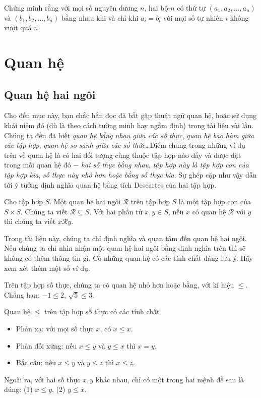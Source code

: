 \begin{exercise}
    Chứng minh rằng với mọi số nguyên dương $n$, hai bộ-$n$ có thứ tự $(a_{1}, a_{2}, \ldots, a_{n})$ và $(b_{1}, b_{2}, \ldots, b_{n})$ bằng nhau khi và chỉ khi $a_{i} = b_{i}$ với mọi số tự nhiên $i$ không vượt quá $n$.
\end{exercise}

\section{Quan hệ}

\subsection{Quan hệ hai ngôi}

Cho đến mục này, bạn chắc hẳn đọc đã bắt gặp thuật ngữ quan hệ, hoặc sử dụng khái niệm đó (dù là theo cách tường minh hay ngầm định) trong tài liệu vài lần. Chúng ta đều đã biết \textit{quan hệ bằng nhau giữa các số thực}, \textit{quan hệ bao hàm giữa các tập hợp}, \textit{quan hệ so sánh giữa các số thức}\ldots Điểm chung trong những ví dụ trên về quan hệ là có hai đối tượng cùng thuộc tập hợp nào đấy và được đặt trong mối quan hệ đó $-$ \textit{hai số thực bằng nhau}, \textit{tập hợp này là tập hợp con của tập hợp kia}, \textit{số thực này nhỏ hơn hoặc bằng số thực kia}. Sự ghép cặp như vậy dẫn tới ý tưởng định nghĩa quan hệ bằng tích Descartes của hai tập hợp.

\begin{definition}
    Cho tập hợp $S$. Một quan hệ hai ngôi $\mathscr{R}$ trên tập hợp $S$ là một tập hợp con của $S\times S$. Chúng ta viết $\mathscr{R}\subseteq S$. Với hai phần tử $x, y\in S$, nếu $x$ có quan hệ $\mathscr{R}$ với $y$ thì chúng ta viết $x\mathscr{R}y$.
\end{definition}

Trong tài liệu này, chúng ta chỉ định nghĩa và quan tâm đến quan hệ hai ngôi. Nếu chúng ta chỉ nhìn nhận một quan hệ hai ngôi bằng định nghĩa trên thì sẽ không có thêm thông tin gì. Có những quan hệ có các tính chất đáng lưu ý. Hãy xem xét thêm một số ví dụ.

\begin{example}
    Trên tập hợp số thực, chúng ta có quan hệ nhỏ hơn hoặc bằng, với kí hiệu $\leq$. Chẳng hạn: $-1\leq 2$, $\sqrt{5}\leq 3$.

    \noindent Quan hệ $\leq$ trên tập hợp số thực có các tính chất
    \begin{itemize}
        \item Phản xạ: với mọi số thực $x$, có $x\leq x$.
        \item Phản đối xứng: nếu $x\leq y$ và $y\leq x$ thì $x = y$.
        \item Bắc cầu: nếu $x\leq y$ và $y\leq z$ thì $x\leq z$.
    \end{itemize}

    Ngoài ra, với hai số thực $x, y$ khác nhau, chỉ có một trong hai mệnh đề sau là đúng: (1) $x\leq y$, (2) $y\leq x$.
\end{example}

